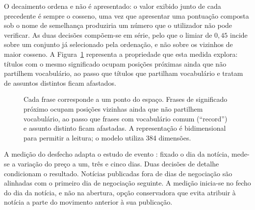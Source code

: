 O decaimento ordena e
não é apresentado: o valor exibido junto de cada precedente é sempre o cosseno, uma vez que
apresentar uma pontuação composta sob o nome de semelhança produziria um número que o utilizador
não pode verificar. As duas decisões compõem-se em série, pelo que o limiar de $0{,}45$ incide sobre
um conjunto já selecionado pela ordenação, e não sobre os vizinhos de maior cosseno. A Figura~\ref{fig:met_embeddings} representa a propriedade que
esta medida explora: títulos com o mesmo significado ocupam posições próximas ainda que não
partilhem vocabulário, ao passo que títulos que partilham vocabulário e tratam de assuntos distintos
ficam afastados.

\begin{figure}[ht]
\centering
{}
\caption[Frases como pontos num espaço]{Cada frase corresponde a um ponto do espaço. Frases de
significado próximo ocupam posições vizinhas ainda que não partilhem vocabulário, ao passo que
frases com vocabulário comum (``record'') e assunto distinto ficam afastadas. A representação é
bidimensional para permitir a leitura; o modelo utiliza 384 dimensões.}
\label{fig:met_embeddings}
\end{figure}

A medição do desfecho adapta o estudo de evento \autocite{brown1985daily}: fixado o dia da notícia,
mede-se a variação do preço a um, três e cinco dias. Duas decisões de detalhe condicionam o
resultado. Notícias publicadas fora de dias de negociação são alinhadas com o primeiro dia de
negociação seguinte. A medição inicia-se no fecho do dia da notícia, e não na abertura, opção
conservadora que evita atribuir à notícia a parte do movimento anterior à sua publicação.

